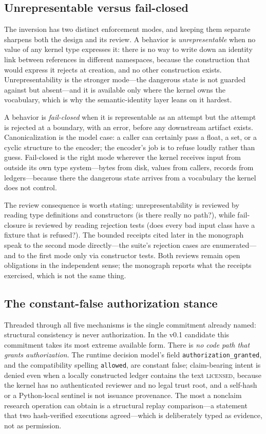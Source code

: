 \subsection{Unrepresentable versus fail-closed}\label{ch01:unrep}

The inversion has two distinct enforcement modes, and keeping them
separate sharpens both the design and its review. A behavior is
\emph{unrepresentable} when no value of any kernel type expresses it:
there is no way to write down an identity link between references in
different namespaces, because the construction that would express it
rejects at creation, and no other construction exists. Unrepresentability
is the stronger mode---the dangerous state is not guarded against but
absent---and it is available only where the kernel owns the vocabulary,
which is why the semantic-identity layer leans on it hardest.

A behavior is \emph{fail-closed} when it is representable as an attempt
but the attempt is rejected at a boundary, with an error, before any
downstream artifact exists. Canonicalization is the model case: a caller
can certainly pass a float, a set, or a cyclic structure to the encoder;
the encoder's job is to refuse loudly rather than guess. Fail-closed is
the right mode wherever the kernel receives input from outside its own
type system---bytes from disk, values from callers, records from
ledgers---because there the dangerous state arrives from a vocabulary
the kernel does not control.

The review consequence is worth stating: unrepresentability is reviewed
by reading type definitions and constructors (is there really no path?),
while fail-closure is reviewed by reading rejection tests (does every
bad input class have a fixture that is refused?). The bounded receipts
cited later in the monograph speak to the second mode directly---the
suite's rejection cases are enumerated---and to the first mode only via
constructor tests. Both reviews remain open obligations in the
independent sense; the monograph reports what the receipts exercised,
which is not the same thing.

\subsection{The constant-false authorization stance}\label{ch01:constfalse}

Threaded through all five mechanisms is the single commitment already
named: structural consistency is never authorization. In the v0.1
candidate this commitment takes its most extreme available form. There is
\emph{no code path that grants authorization}. The runtime decision
model's field \texttt{authorization\_granted}, and the compatibility
spelling \texttt{allowed}, are constant false; claim-bearing intent is
denied even when a locally constructed ledger contains the text
\textsc{licensed}, because the kernel has no authenticated reviewer and
no legal trust root, and a self-hash or a Python-local sentinel is not
issuance provenance. The most a nonclaim research operation can obtain is
a structural replay comparison---a statement that two hash-verified
executions agreed---which is deliberately typed as evidence, not as
permission.

